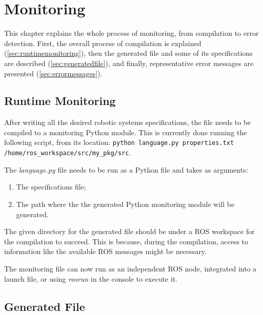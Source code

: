 \chapter{Monitoring}
\label{chap:monitoring}

This chapter explains the whole process of monitoring, from compilation to error detection. First, the overall process of compilation is explained (\autoref{sec:runtimemonitoring}), then the generated file and some of its specifications are described (\autoref{sec:generatedfile}), and finally, representative error messages are presented (\autoref{sec:errormessages}).


\section{Runtime Monitoring}
\label{sec:runtimemonitoring}

After writing all the desired robotic systems specifications, the file needs to be compiled to a monitoring Python module. This is currently done running the following script, from its location: \lstinline{python language.py properties.txt /home/ros_workspace/src/my_pkg/src}.

The \textit{language.py} file needs to be run as a Python file and takes as arguments:

\begin{enumerate}
    \item The specifications file;
    \item The path where the the generated Python monitoring module will be generated.
\end{enumerate}

The given directory for the generated file should be under a ROS workspace for the compilation to succeed. This is because, during the compilation, access to information like the available ROS messages might be necessary.

The monitoring file can now run as an independent ROS node, integrated into a launch file, or using \textit{rosrun} in the console to execute it.


\section{Generated File} 
\label{sec:generatedfile}

